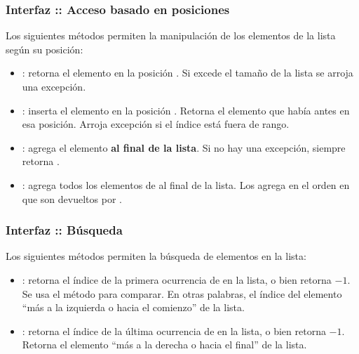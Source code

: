 \documentclass{beamer}
\begin{document}
\begin{frame}
  \frametitle{Interfaz  :: Acceso basado en
    posiciones}

  Los siguientes métodos permiten la manipulación de los elementos de
  la lista según su posición:

  \begin{itemize}
    
  \item {}: retorna el elemento en la
    posición . Si  excede el tamaño de la
    lista se arroja una excepción.
    
  \item {}: inserta el elemento
     en la posición . Retorna el elemento que
    había antes en esa posición. Arroja excepción si el índice está
    fuera de rango.
    
  \item {}: agrega el elemento 
    \textbf{al final de la lista}. Si no hay una excepción, siempre
    retorna .

    
  \item {}: agrega
    todos los elementos de  al final de la lista. Los agrega
    en el orden en que son devueltos por .
    
  \end{itemize}
  
\end{frame}

\begin{frame}
  \frametitle{Interfaz  :: Búsqueda}

  Los siguientes métodos permiten la búsqueda de elementos en la lista:

  \begin{itemize}
    
  \item {}: retorna el índice de la primera
    ocurrencia de  en la lista, o bien retorna $-1$. Se usa
    el método  para comparar. En otras palabras, el
    índice del elemento ``más a la izquierda o hacia el comienzo'' de
    la lista.
  
  \item {}: retorna el índice de la
    última ocurrencia de  en la lista, o bien retorna
    $-1$. Retorna el elemento ``más a la derecha o hacia el final'' de
    la lista.
    
  \end{itemize}
  
\end{frame}
\end{document}
